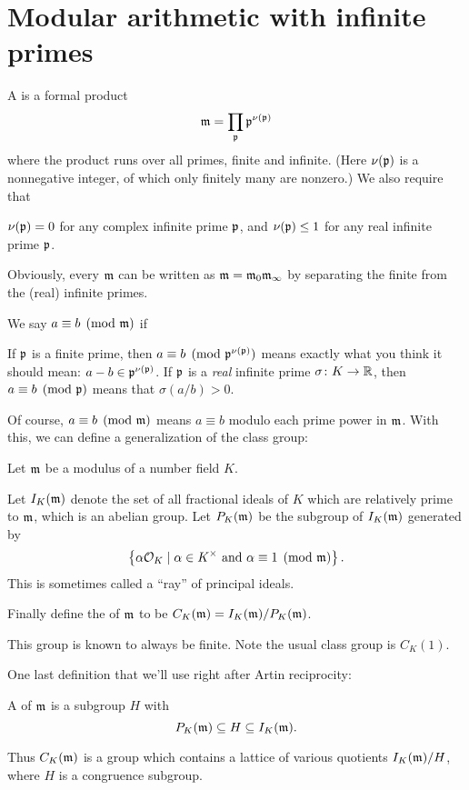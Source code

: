 \section{Modular arithmetic with infinite primes}
A  is a formal product
\[ \mathfrak m = \prod_{\mathfrak p} \mathfrak p^{\nu(\mathfrak p)} \]
where the product runs over all primes, finite and infinite.
(Here $\nu(\mathfrak p)$ is a nonnegative integer,
of which only finitely many are nonzero.)
We also require that
\begin{itemize}
	\ii $\nu(\mathfrak p) = 0$ for any complex infinite prime $\mathfrak p$, and
	\ii $\nu(\mathfrak p) \le 1$ for any real infinite prime $\mathfrak p$.
\end{itemize}
Obviously, every $\mathfrak m$ can be written as $\mathfrak m = \mathfrak m_0\mathfrak m_\infty$
by separating the finite from the (real) infinite primes.

We say $a \equiv b \pmod{\mathfrak m}$ if
\begin{itemize}
	\ii If $\mathfrak p$ is a finite prime, then $a \equiv b \pmod{\mathfrak p^{\nu(\mathfrak p)}}$
	means exactly what you think it should mean:
	$a-b \in \mathfrak p^{\nu(\mathfrak p)}$.
	\ii If $\mathfrak p$ is a \emph{real} infinite prime $\sigma \colon K \to \mathbb R$, then
	$a \equiv b \pmod{\mathfrak p}$ means that $\sigma(a/b) > 0$.
\end{itemize}
Of course, $a \equiv b \pmod{\mathfrak m}$ means $a \equiv b$
modulo each prime power in $\mathfrak m$.
With this, we can define a generalization of the class group:
\begin{definition}
	Let $\mathfrak m$ be a modulus of a number field $K$.
	\begin{itemize}
		\ii Let $I_K(\mathfrak m)$ denote the set of all fractional ideals of $K$
		which are relatively prime to $\mathfrak m$, which is an abelian group.
		\ii Let $P_K(\mathfrak m)$ be the subgroup of $I_K(\mathfrak m)$ generated by
		\[
			\left\{
				\alpha \mathcal O_K
				\mid
				\alpha \in K^\times \text{ and }
				\alpha \equiv 1 \pmod{\mathfrak m}
			\right\}.
		\]
		This is sometimes called a ``ray'' of principal ideals.
	\end{itemize}
	Finally define the  of $\mathfrak m$
	to be $C_K(\mathfrak m) = I_K(\mathfrak m) / P_K(\mathfrak m)$.
\end{definition}
This group is known to always be finite.
Note the usual class group is $C_K(1)$.

One last definition that we'll use right after Artin reciprocity:
\begin{definition}
	A  of $\mathfrak m$ is a subgroup $H$ with
	\[ P_K(\mathfrak m) \subseteq H \subseteq I_K(\mathfrak m). \]
\end{definition}
Thus $C_K(\mathfrak m)$ is a group which contains a lattice of various
quotients $I_K(\mathfrak m) / H$, where $H$ is a congruence subgroup.

